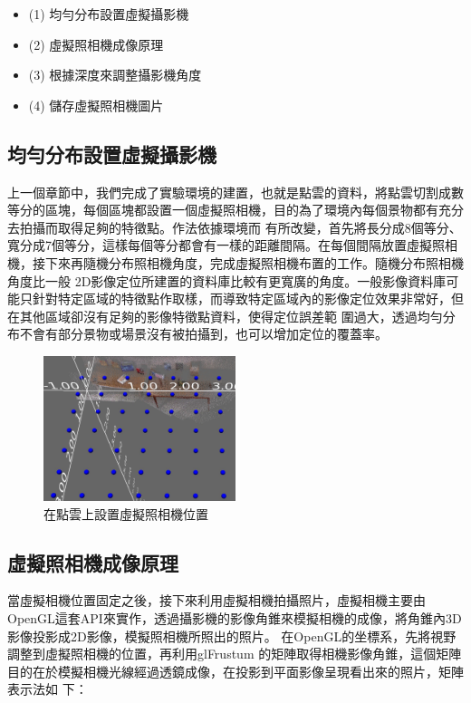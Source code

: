 	\begin{itemize}
		\item (1) 均勻分布設置虛擬攝影機
    	\item (2) 虛擬照相機成像原理
    	\item (3) 根據深度來調整攝影機角度
    	\item (4) 儲存虛擬照相機圖片
	\end{itemize}  		

\subsection{均勻分布設置虛擬攝影機}
%
	上一個章節中，我們完成了實驗環境的建置，也就是點雲的資料，將點雲切割成數等分的區塊，每個區塊都設置一個虛擬照相機，目的為了環境內每個景物都有充分去拍攝而取得足夠的特徵點。作法依據環境而
	有所改變，首先將長分成8個等分、寬分成7個等分，這樣每個等分都會有一樣的距離間隔。在每個間隔放置虛擬照相機，接下來再隨機分布照相機角度，完成虛擬照相機布置的工作。隨機分布照相機角度比一般
	2D影像定位所建置的資料庫比較有更寬廣的角度。一般影像資料庫可能只針對特定區域的特徵點作取樣，而導致特定區域內的影像定位效果非常好，但在其他區域卻沒有足夠的影像特徵點資料，使得定位誤差範
	圍過大，透過均勻分布不會有部分景物或場景沒有被拍攝到，也可以增加定位的覆蓋率。
	
	\begin{figure}
	\begin{center}
	  \includegraphics[width=0.5\textwidth]{figures/VirtualCameraPose.jpg}
	  \caption{在點雲上設置虛擬照相機位置}
	  \label{fig:Virtual Camera Pose}
	\end{center}
	\end{figure}
	


\subsection{虛擬照相機成像原理}
%
	當虛擬相機位置固定之後，接下來利用虛擬相機拍攝照片，虛擬相機主要由OpenGL這套API來實作，透過攝影機的影像角錐來模擬相機的成像，將角錐內3D影像投影成2D影像，模擬照相機所照出的照片。
	在OpenGL的坐標系，先將視野調整到虛擬照相機的位置，再利用glFrustum 的矩陣取得相機影像角錐，這個矩陣目的在於模擬相機光線經過透鏡成像，在投影到平面影像呈現看出來的照片，矩陣表示法如
	下：
	
